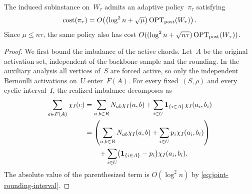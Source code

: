 \documentclass[12pt,a4paper,oneside]{report}
\begin{document}
\begin{lemma}
\label{lem:adaptive-circulation-cost}
The induced subinstance on~$W_\tau$ admits an adaptive policy~$\pi_\tau$
satisfying
\begin{equation}\label{eq:low-probability-policy}
    \operatorname{cost}(\pi_\tau)
    =O\!\left(
       \bigl(\log^2 n+\sqrt\mu\bigr)\operatorname{OPT}_\mathrm{post}(W_\tau)
     \right).
\end{equation}
Since $\mu\le n\tau$, the same policy also has cost
$O((\log^2 n+\sqrt{n\tau})\operatorname{OPT}_\mathrm{post}(W_\tau))$.
\end{lemma}

\begin{proof}
We first bound the imbalance of the active chords.  Let~$A$ be the
original activation set, independent of the backbone sample and the
rounding.  In the auxiliary analysis all vertices of~$S$ are forced active,
so only the independent Bernoulli activations on~$U$ enter~$F(A)$.
For every fixed~$(S,\rho)$ and every cyclic interval~$I$, the realized
imbalance decomposes as
\begin{align*}
    \sum_{e\in F(A)}\chi_I(e)
    &=
      \sum_{a,b\in R}N_{ab}\chi_I(a,b)
      +\sum_{i\in U}\mathbf{1}_{\{i\in A\}}\chi_I(a_i,b_i)\\
    &=
      \left(
        \sum_{a,b\in R}N_{ab}\chi_I(a,b)
        +\sum_{i\in U}p_i\chi_I(a_i,b_i)
      \right)\\
    &\qquad
      +\sum_{i\in U}
       \bigl(\mathbf{1}_{\{i\in A\}}-p_i\bigr)\chi_I(a_i,b_i).
\end{align*}
The absolute value of the parenthesized term is $O(\log^2 n)$ by
\cref{eq:joint-rounding-interval}.


\end{proof}
\end{document}
